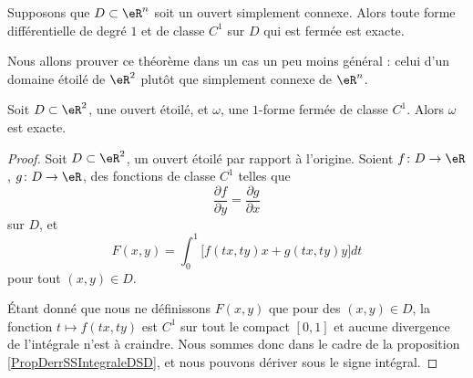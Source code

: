 \begin{theorem}        \label{ThoFermeExactFormRappel}
Supposons que $D\subset\eR^n$ soit un ouvert simplement connexe. Alors toute forme différentielle de degré $1$ et de classe $C^1$ sur $D$ qui est fermée est exacte.
\end{theorem}

Nous allons prouver ce théorème dans un cas un peu moins général : celui d'un domaine étoilé de \( \eR^2\) plutôt que simplement connexe de \( \eR^n\).

\begin{theorem} \label{ThoMSofFxL}
Soit $D\subset\eR^2$, une ouvert étoilé, et $\omega$, une $1$-forme fermée de classe $C^1$. Alors $\omega$ est exacte.
\end{theorem}
\begin{proof}

Soit $D\subset\eR^2$, un ouvert étoilé par rapport à l'origine. Soient $f\colon D\to \eR$, $g\colon D\to \eR$, des fonctions de classe $C^1$ telles que
\begin{equation}
	\frac{ \partial f }{ \partial y }=\frac{ \partial g }{ \partial x }
\end{equation}
sur $D$, et
\begin{equation}		\label{EqIMDefFformI33}
	F(x,y)=\int_0^1\big[  f(tx,ty)x+g(tx,ty)y  \big]dt
\end{equation}
pour tout $(x,y)\in D$. 

Étant donné que nous ne définissons $F(x,y)$ que pour des $(x,y)\in D$, la fonction $t\mapsto f(tx,ty)$ est $C^1$ sur tout le compact $[0,1]$ et aucune divergence de l'intégrale n'est à craindre. Nous sommes donc dans le cadre de la proposition \ref{PropDerrSSIntegraleDSD}, et nous pouvons dériver sous le signe intégral.


\end{proof}
